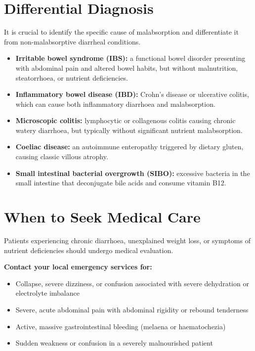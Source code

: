 \section*{Differential Diagnosis}
It is crucial to identify the specific cause of malabsorption and differentiate it from non-malabsorptive diarrheal conditions.
\begin{itemize}
    \item \textbf{Irritable bowel syndrome (IBS):} a functional bowel disorder presenting with abdominal pain and altered bowel habits, but without malnutrition, steatorrhoea, or nutrient deficiencies.
    \item \textbf{Inflammatory bowel disease (IBD):} Crohn's disease or ulcerative colitis, which can cause both inflammatory diarrhoea and malabsorption.
    \item \textbf{Microscopic colitis:} lymphocytic or collagenous colitis causing chronic watery diarrhoea, but typically without significant nutrient malabsorption.
    \item \textbf{Coeliac disease:} an autoimmune enteropathy triggered by dietary gluten, causing classic villous atrophy.
    \item \textbf{Small intestinal bacterial overgrowth (SIBO):} excessive bacteria in the small intestine that deconjugate bile acids and consume vitamin B12.
\end{itemize}

\section*{When to Seek Medical Care}
Patients experiencing chronic diarrhoea, unexplained weight loss, or symptoms of nutrient deficiencies should undergo medical evaluation.

\textbf{Contact your local emergency services for:}
\begin{itemize}
    \item Collapse, severe dizziness, or confusion associated with severe dehydration or electrolyte imbalance
    \item Severe, acute abdominal pain with abdominal rigidity or rebound tenderness
    \item Active, massive gastrointestinal bleeding (melaena or haematochezia)
    \item Sudden weakness or confusion in a severely malnourished patient
\end{itemize}

